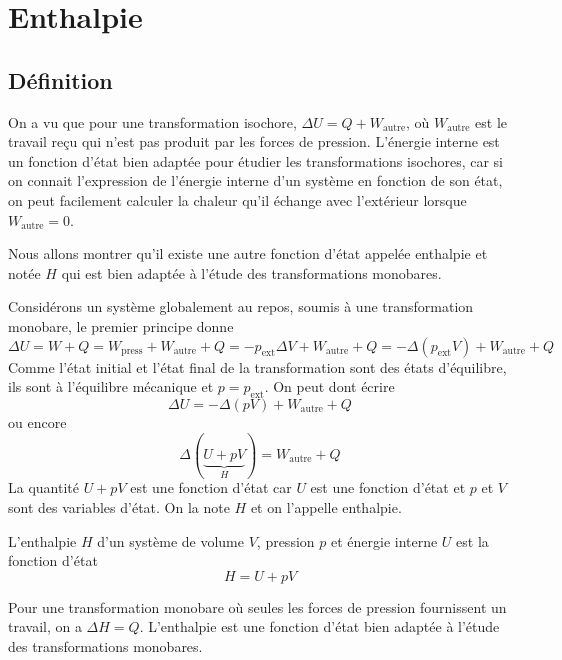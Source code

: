 \documentclass{cours}
\begin{document}
\section{Enthalpie}%
\label{sec:enthalpie}

\subsection{Définition}%
\label{sub:definition_enthalpie}

On a vu que pour une transformation isochore, $\Delta U = Q + W_\text{autre}$, où $W_\text{autre}$ est le travail reçu qui n'est pas produit par les forces de pression. L'énergie interne est un fonction d'état bien adaptée pour étudier les transformations isochores, car si on connait l'expression de l'énergie interne d'un système en fonction de son état, on peut facilement calculer la chaleur qu'il échange avec l'extérieur lorsque $W_\text{autre}=0$. 

Nous allons montrer qu'il existe une autre fonction d'état appelée enthalpie et notée $H$ qui est bien adaptée à l'étude des transformations monobares.

Considérons un système globalement au repos, soumis à une transformation monobare, le premier principe donne 
\begin{equation}
  \Delta U = W + Q = W_\text{press} + W_\text{autre} + Q =  -p_\text{ext}\Delta V +  W_\text{autre} + Q = -\Delta(p_\text{ext}V) + W_\text{autre} + Q
\end{equation}
Comme l'état initial et l'état final de la transformation sont des états d'équilibre, ils sont à l'équilibre mécanique et $p=p_\text{ext}$. On peut dont écrire
\begin{equation}
  \Delta U = -\Delta(pV) + W_\text{autre} + Q
\end{equation}
ou encore
\begin{equation}
  \Delta(\underbrace{U+pV}_{H}) = W_\text{autre} + Q
\end{equation}
La quantité $U+pV$ est une fonction d'état car $U$ est une fonction d'état et $p$ et $V$ sont des variables d'état. On la note $H$ et on l'appelle enthalpie.

\begin{definition}
  L'enthalpie $H$ d'un système de volume $V$, pression $p$ et énergie interne $U$ est la fonction d'état 
  \begin{equation}
    H = U + pV
  \end{equation}
\end{definition}
Pour une transformation monobare où seules les forces de pression fournissent un travail, on a $\Delta H = Q$. L'enthalpie est une fonction d'état bien adaptée à l'étude des transformations monobares.
\end{document}
